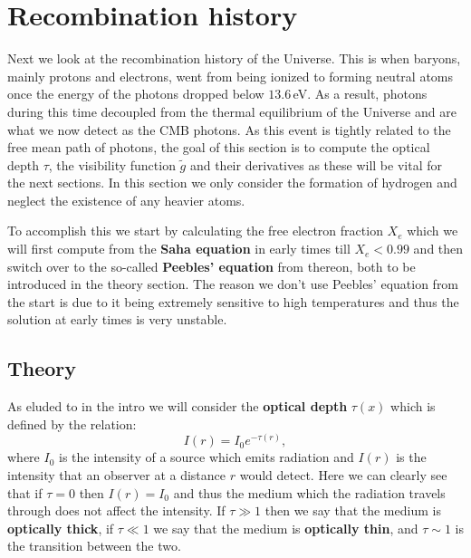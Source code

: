 \documentclass[%
reprint,
 amsmath,amssymb,
 aps,
]{revtex4-2}
\begin{document}
\section{Recombination history}
\label{sec:2}
Next we look at the recombination history of the Universe. This is when baryons, mainly protons and electrons, went from being ionized to forming neutral atoms once the energy of the photons dropped below $13.6\,$eV. As a result, photons during this time decoupled from the thermal equilibrium of the Universe and are what we now detect as the CMB photons. As this event is tightly related to the free mean path of photons, the goal of this section is to compute the optical depth $\tau$, the visibility function $\tilde g$ and their derivatives as these will be vital for the next sections. In this section we only consider the formation of hydrogen and neglect the existence of any heavier atoms.

To accomplish this we start by calculating the free electron fraction $X_e$ which we will first compute from the \textbf{Saha equation} in early times till $X_e<0.99$ and then switch over to the so-called \textbf{Peebles' equation} from thereon, both to be introduced in the theory section. The reason we don't use Peebles' equation from the start is due to it being extremely sensitive to high temperatures and thus the solution at early times is very unstable.

\subsection{Theory}
As eluded to in the intro we will consider the \textbf{optical depth} $\tau(x)$ which is defined by the relation:
\begin{equation}
	I(r)=I_0e^{-\tau(r)},\label{eq:intensity}
\end{equation}
where $I_0$ is the intensity of a source which emits radiation and $I(r)$ is the intensity that an observer at a distance $r$ would detect. Here we can clearly see that if $\tau=0$ then $I(r)=I_0$ and thus the medium which the radiation travels through does not affect the intensity. If $\tau\gg1$ then we say that the medium is \textbf{optically thick}, if $\tau\ll1$ we say that the medium is \textbf{optically thin}, and $\tau\sim1$ is the transition between the two.
\end{document}
